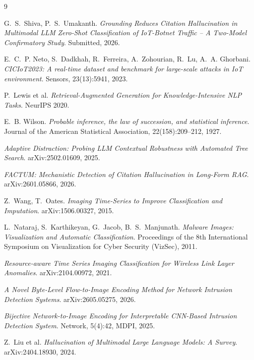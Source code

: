 \documentclass[twocolumn]{svjour3}
\begin{document}
\begin{thebibliography}{9}

G.~S.~Shiva, P.~S.~Umakanth.
\textit{Grounding Reduces Citation Hallucination in Multimodal LLM Zero-Shot Classification of
IoT-Botnet Traffic -- A Two-Model Confirmatory Study}. Submitted, 2026.

E.~C.~P. Neto, S.~Dadkhah, R.~Ferreira, A.~Zohourian, R.~Lu, A.~A. Ghorbani.
\textit{CICIoT2023: A real-time dataset and benchmark for large-scale attacks in IoT
environment}. Sensors, 23(13):5941, 2023.

P.~Lewis et al.
\textit{Retrieval-Augmented Generation for Knowledge-Intensive NLP Tasks}.
NeurIPS 2020.

E.~B. Wilson.
\textit{Probable inference, the law of succession, and statistical inference}.
Journal of the American Statistical Association, 22(158):209--212, 1927.

\textit{Adaptive Distraction: Probing LLM Contextual Robustness with Automated Tree Search}.
arXiv:2502.01609, 2025.

\textit{FACTUM: Mechanistic Detection of Citation Hallucination in Long-Form RAG}.
arXiv:2601.05866, 2026.

Z.~Wang, T.~Oates.
\textit{Imaging Time-Series to Improve Classification and Imputation}.
arXiv:1506.00327, 2015.

L.~Nataraj, S.~Karthikeyan, G.~Jacob, B.~S.~Manjunath.
\textit{Malware Images: Visualization and Automatic Classification}.
Proceedings of the 8th International Symposium on Visualization for Cyber Security (VizSec), 2011.

\textit{Resource-aware Time Series Imaging Classification for Wireless Link Layer Anomalies}.
arXiv:2104.00972, 2021.

\textit{A Novel Byte-Level Flow-to-Image Encoding Method for Network Intrusion Detection Systems}.
arXiv:2605.05275, 2026.

\textit{Bijective Network-to-Image Encoding for Interpretable CNN-Based Intrusion Detection System}.
Network, 5(4):42, MDPI, 2025.

Z.~Liu et al.
\textit{Hallucination of Multimodal Large Language Models: A Survey}.
arXiv:2404.18930, 2024.

\end{thebibliography}
\end{document}
